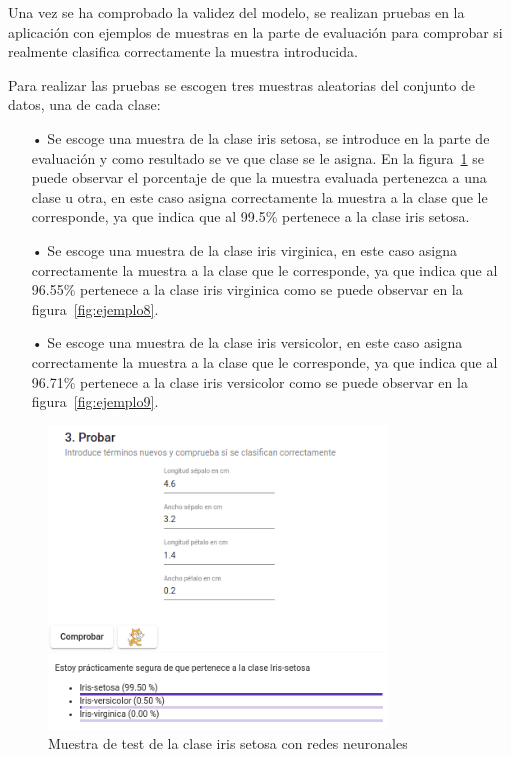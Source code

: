\documentclass[a4paper, 12pt]{book}
\begin{document}
Una vez se ha comprobado la validez del modelo, se realizan pruebas en la aplicación con ejemplos de muestras en la parte de evaluación para comprobar si realmente clasifica correctamente la muestra introducida. 

Para realizar las pruebas se escogen tres muestras aleatorias del conjunto de datos, una de cada clase:
\begin{itemize}

\item[•] Se escoge una muestra de la clase iris setosa, se introduce en la parte de evaluación y como resultado se ve que clase se le asigna. En la figura~\ref{fig:ejemplo7} se puede observar el porcentaje de que la muestra evaluada pertenezca a una clase u otra, en este caso asigna correctamente la muestra a la clase que le corresponde, ya que indica que al 99.5\% pertenece a la clase iris setosa. 

\item[•] Se escoge una muestra de la clase iris virginica, en este caso asigna correctamente la muestra a la clase que le corresponde, ya que indica que al 96.55\% pertenece a la clase iris virginica como se puede observar en la figura~\ref{fig:ejemplo8}.

\item[•] Se escoge una muestra de la clase iris versicolor, en este caso asigna correctamente la muestra a la clase que le corresponde, ya que indica que al 96.71\% pertenece a la clase iris versicolor como se puede observar en la figura~\ref{fig:ejemplo9}.
\end{itemize}

\begin{figure}
	\centering
	\includegraphics[width=9cm, keepaspectratio]{img/iris_set_num_rn.png}
	\caption{Muestra de test de la clase iris setosa con redes neuronales} 	\label{fig:ejemplo7}
\end{figure}
\end{document}
